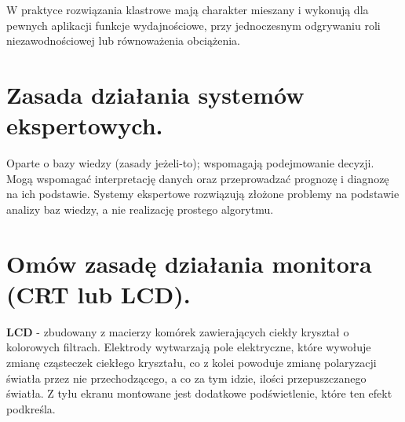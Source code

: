 \documentclass[12pt,a4paper]{article}
\begin{document}
	W praktyce rozwiązania klastrowe mają charakter mieszany i wykonują dla pewnych aplikacji funkcje wydajnościowe, przy jednoczesnym odgrywaniu roli niezawodnościowej lub równoważenia obciążenia.

	\section{Zasada działania systemów ekspertowych.}
	Oparte o bazy wiedzy (zasady jeżeli-to); wspomagają podejmowanie decyzji. Mogą wspomagać interpretację danych oraz przeprowadzać prognozę i diagnozę na ich podstawie.
	Systemy ekspertowe rozwiązują złożone problemy na podstawie analizy baz wiedzy, a nie realizację prostego algorytmu.

	\section{Omów zasadę działania monitora (CRT lub LCD).}
	\label{sec:zasdziallcd}
	\textbf{LCD} - zbudowany z macierzy komórek zawierających ciekły kryształ o kolorowych filtrach. Elektrody wytwarzają pole elektryczne, które wywołuje zmianę cząsteczek ciekłego kryształu, co z kolei powoduje zmianę polaryzacji światła przez nie przechodzącego, a co za tym idzie, ilości przepuszczanego światła. Z tyłu ekranu montowane jest dodatkowe podświetlenie, które ten efekt podkreśla.
\end{document}
